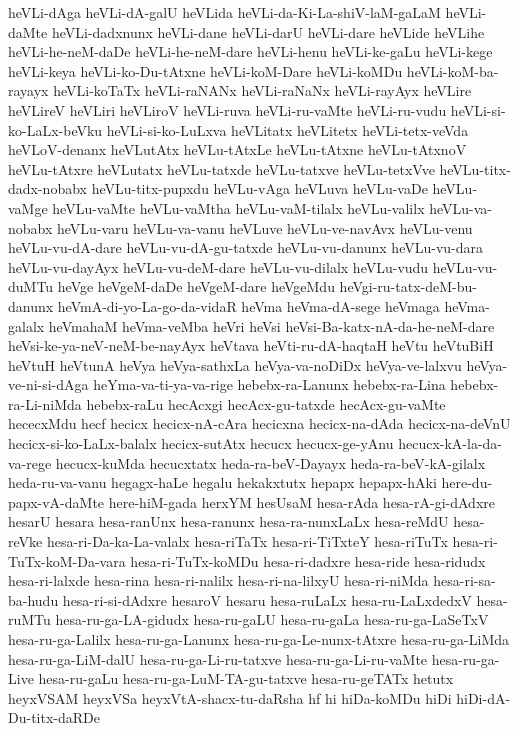 {heVLi-dAga
heVLi-dA-galU
heVLida
heVLi-da-Ki-La-shiV-laM-gaLaM
heVLi-daMte
heVLi-dadxnunx
heVLi-dane
heVLi-darU
heVLi-dare
heVLide
heVLihe
heVLi-he-neM-daDe
heVLi-he-neM-dare
heVLi-henu
heVLi-ke-gaLu
heVLi-kege
heVLi-keya
heVLi-ko-Du-tAtxne
heVLi-koM-Dare
heVLi-koMDu
heVLi-koM-ba-rayayx
heVLi-koTaTx
heVLi-raNANx
heVLi-raNaNx
heVLi-rayAyx
heVLire
heVLireV
heVLiri
heVLiroV
heVLi-ruva
heVLi-ru-vaMte
heVLi-ru-vudu
heVLi-si-ko-LaLx-beVku
heVLi-si-ko-LuLxva
heVLitatx
heVLitetx
heVLi-tetx-veVda
heVLoV-denanx
heVLutAtx
heVLu-tAtxLe
heVLu-tAtxne
heVLu-tAtxnoV
heVLu-tAtxre
heVLutatx
heVLu-tatxde
heVLu-tatxve
heVLu-tetxVve
heVLu-titx-dadx-nobabx
heVLu-titx-pupxdu
heVLu-vAga
heVLuva
heVLu-vaDe
heVLu-vaMge
heVLu-vaMte
heVLu-vaMtha
heVLu-vaM-tilalx
heVLu-valilx
heVLu-va-nobabx
heVLu-varu
heVLu-va-vanu
heVLuve
heVLu-ve-navAvx
heVLu-venu
heVLu-vu-dA-dare
heVLu-vu-dA-gu-tatxde
heVLu-vu-danunx
heVLu-vu-dara
heVLu-vu-dayAyx
heVLu-vu-deM-dare
heVLu-vu-dilalx
heVLu-vudu
heVLu-vu-duMTu
heVge
heVgeM-daDe
heVgeM-dare
heVgeMdu
heVgi-ru-tatx-deM-bu-danunx
heVmA-di-yo-La-go-da-vidaR
heVma
heVma-dA-sege
heVmaga
heVma-galalx
heVmahaM
heVma-veMba
heVri
heVsi
heVsi-Ba-katx-nA-da-he-neM-dare
heVsi-ke-ya-neV-neM-be-nayAyx
heVtava
heVti-ru-dA-haqtaH
heVtu
heVtuBiH
heVtuH
heVtunA
heVya
heVya-sathxLa
heVya-va-noDiDx
heVya-ve-lalxvu
heVya-ve-ni-si-dAga
heYma-va-ti-ya-va-rige
hebebx-ra-Lanunx
hebebx-ra-Lina
hebebx-ra-Li-niMda
hebebx-raLu
hecAcxgi
hecAcx-gu-tatxde
hecAcx-gu-vaMte
hececxMdu
hecf
hecicx
hecicx-nA-cAra
hecicxna
hecicx-na-dAda
hecicx-na-deVnU
hecicx-si-ko-LaLx-balalx
hecicx-sutAtx
hecucx
hecucx-ge-yAnu
hecucx-kA-la-da-va-rege
hecucx-kuMda
hecucxtatx
heda-ra-beV-Dayayx
heda-ra-beV-kA-gilalx
heda-ru-va-vanu
hegagx-haLe
hegalu
hekakxtutx
hepapx
hepapx-hAki
here-du-papx-vA-daMte
here-hiM-gada
herxYM
hesUsaM
hesa-rAda
hesa-rA-gi-dAdxre
hesarU
hesara
hesa-ranUnx
hesa-ranunx
hesa-ra-nunxLaLx
hesa-reMdU
hesa-reVke
hesa-ri-Da-ka-La-valalx
hesa-riTaTx
hesa-ri-TiTxteY
hesa-riTuTx
hesa-ri-TuTx-koM-Da-vara
hesa-ri-TuTx-koMDu
hesa-ri-dadxre
hesa-ride
hesa-ridudx
hesa-ri-lalxde
hesa-rina
hesa-ri-nalilx
hesa-ri-na-lilxyU
hesa-ri-niMda
hesa-ri-sa-ba-hudu
hesa-ri-si-dAdxre
hesaroV
hesaru
hesa-ruLaLx
hesa-ru-LaLxdedxV
hesa-ruMTu
hesa-ru-ga-LA-gidudx
hesa-ru-gaLU
hesa-ru-gaLa
hesa-ru-ga-LaSeTxV
hesa-ru-ga-Lalilx
hesa-ru-ga-Lanunx
hesa-ru-ga-Le-nunx-tAtxre
hesa-ru-ga-LiMda
hesa-ru-ga-LiM-dalU
hesa-ru-ga-Li-ru-tatxve
hesa-ru-ga-Li-ru-vaMte
hesa-ru-ga-Live
hesa-ru-gaLu
hesa-ru-ga-LuM-TA-gu-tatxve
hesa-ru-geTATx
hetutx
heyxVSAM
heyxVSa
heyxVtA-shacx-tu-daRsha
hf
hi
hiDa-koMDu
hiDi
hiDi-dA-Du-titx-daRDe
}

